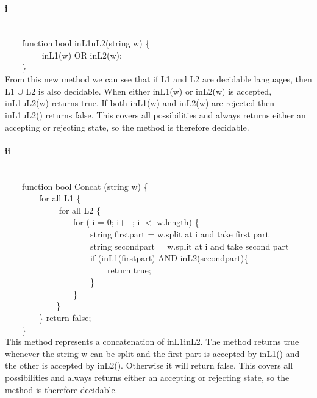\documentclass[10pt,letter]{article}
\begin{document}
\paragraph{i}
\ \\
{\selectfont
$\qquad$function bool inL1uL2(string w) \{ \\
$\qquad$$\qquad$  inL1(w) OR inL2(w); \\
$\qquad$\} \\}
From this new method we can see that if L1 and L2 are decidable languages, then L1 $\cup$ L2 is also decidable. When either {\selectfont inL1(w)} or {\selectfont inL2(w)} is accepted, {\selectfont inL1uL2(w)} returns true. If both {\selectfont inL1(w)} and {\selectfont inL2(w)} are rejected then {\selectfont inL1uL2()} returns false. This covers all possibilities and always returns either an accepting or rejecting state, so the method is therefore decidable. 

\paragraph{ii}
\ \\
{\selectfont
$\qquad$function bool Concat (string w)  \{  \\
$\qquad$$\qquad$for all L1 \{ \\
$\qquad$$\qquad$ $\qquad$for all L2 \{ \\
$\qquad$$\qquad$$\qquad$$\qquad$for ( i = 0; i++; i $<$ w.length) \{ \\	
$\qquad$$\qquad$$\qquad$$\qquad$$\qquad$string firstpart = w.split at i and take first part\\
$\qquad$$\qquad$$\qquad$$\qquad$$\qquad$string secondpart = w.split at i and take second part\\
$\qquad$$\qquad$$\qquad$$\qquad$$\qquad$if (inL1(firstpart) AND inL2(secondpart)\{ \\
$\qquad$$\qquad$$\qquad$$\qquad$$\qquad$$\qquad$return true;\\
$\qquad$$\qquad$$\qquad$$\qquad$$\qquad$\} \\
$\qquad$$\qquad$$\qquad$$\qquad$\} \\ 
$\qquad$$\qquad$$\qquad$\} \\
$\qquad$$\qquad$\} return false; \\
$\qquad$\} \\}
This method represents a concatenation of inL1inL2. The method returns true whenever the string w can be split and the first part is accepted by {\selectfont inL1()} and the other is accepted by {\selectfont inL2()}. Otherwise it will return false. This covers all possibilities and always returns either an accepting or rejecting state, so the method is therefore decidable. 
\end{document}
